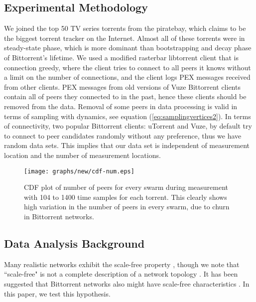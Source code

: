 \documentclass[paper]{ieice}
\begin{document}
\subsection{Experimental Methodology}
We joined the top 50 TV series torrents from the piratebay, which claims to be the biggest torrent tracker on the Internet.
Almost all of these torrents were in steady-state phase, which is more dominant than bootstrapping and decay phase of Bittorrent's lifetime.
We used a modified rasterbar libtorrent \cite{rasterbar} client that is connection greedy, where the client tries to connect to all peers it knows without a limit on the number of connections, and the client logs PEX messages received from other clients.
PEX messages from old versions of Vuze Bittorrent clients contain all of peers they connected to in the past, hence these clients should be removed from the data.
Removal of some peers in data processing is valid in terms of sampling with dynamics, see equation (\ref{eq:samplingvertices2}).
In terms of connectivity, two popular Bittorrent clients: uTorrent and Vuze, by default try to connect to peer candidates randomly without any preference, thus we have random data sets.
This implies that our data set is independent of measurement location and the number of measurement locations.

\begin{figure}[tb]
\begin{center}
\texttt{[image: graphs/new/cdf-num.eps]}
\end{center}
\caption{CDF plot of number of peers for every swarm during measurement with 104 to 1400 time samples for each torrent. This clearly shows high variation in the number of peers in every swarm, due to churn in Bittorrent networks.} 
\label{fig:num_peers}
\end{figure}

\subsection{Data Analysis Background}
Many realistic networks exhibit the scale-free property \cite{clauset2009power}, though we note that ``scale-free" is not a complete description of a network topology \cite{doyle2005robust}\cite{mahadevan2006systematic}. 
It has been suggested that Bittorrent networks also might have scale-free characteristics \cite{dale2008evolution}. 
In this paper, we test this hypothesis. 
\end{document}
